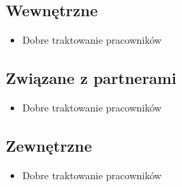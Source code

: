 \subsection*{Wewnętrzne}

\begin{itemize}
\item Dobre traktowanie pracowników
\end{itemize}

\subsection*{Związane z partnerami}

\begin{itemize}
\item Dobre traktowanie pracowników
\end{itemize}

\subsection*{Zewnętrzne}

\begin{itemize}
\item Dobre traktowanie pracowników
\end{itemize}

